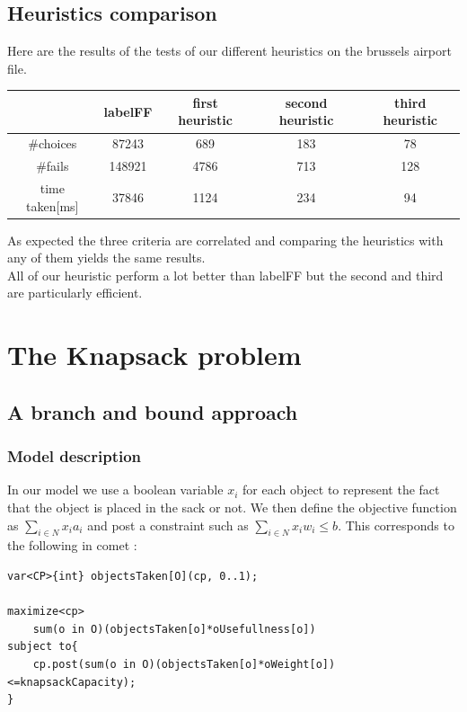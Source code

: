 \documentclass{eplDoc}
\begin{document}
\subsection{Heuristics comparison} %
Here are the results of the tests of our different heuristics on the brussels airport file. 
\begin{table}[h]
	\centering
		\begin{tabular}{|c|cccc|}
			\hline
			  & labelFF & first heuristic & second heuristic & third heuristic \\ 
			  \hline
			\#choices &  87243 & 689 & 183 & 78 \\ 
			\#fails & 148921 & 4786 & 713 & 128 \\
			time taken[ms] & 37846 & 1124 & 234 & 94 \\ 
			\hline
			
		\end{tabular}
\end{table}
As expected the three criteria are correlated and comparing the heuristics with any of them yields the same results. \\ 
All of our heuristic perform a lot better than labelFF but the second and third are particularly efficient. 

\section{The Knapsack problem}
\subsection{A branch and bound approach} %

\subsubsection{Model description}
In our model we use a boolean variable $x_i$ for each object to represent the fact that the object is placed in the sack or not. We then define the objective function as  $\sum_{i \in N} x_ia_i$ and post a constraint such as $\sum_{i \in N}x_iw_i \le b$. This corresponds to the following in comet : 
\begin{lstlisting}
var<CP>{int} objectsTaken[O](cp, 0..1);         

maximize<cp>
    sum(o in O)(objectsTaken[o]*oUsefullness[o])
subject to{
    cp.post(sum(o in O)(objectsTaken[o]*oWeight[o])<=knapsackCapacity);
}
\end{lstlisting}
\end{document}
